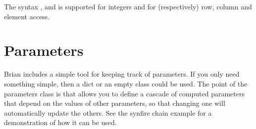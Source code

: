 \documentclass[letterpaper,10pt,english]{manual}
\begin{document}
The syntax ,  and  is supported for integers 
and  for (respectively) row, column and element access.

\resetcurrentobjects
\hypertarget{--doc-parameters}{}

\section{Parameters}

Brian includes a simple tool for keeping track of parameters. If you only need
something simple, then a dict or an empty class could be used. The point of the
parameters class is that allows you to define a cascade of computed parameters
that depend on the values of other parameters, so that changing one will
automatically update the others. See the synfire chain example
 for a demonstration of how it can be used.
\end{document}
